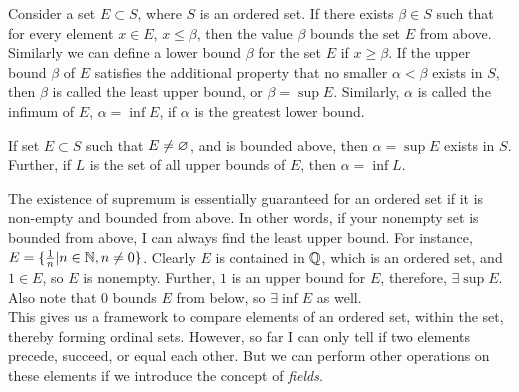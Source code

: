 Consider a set $E\subset S$, where $S$ is an ordered set. If there exists $\beta\in S$ such that for every element $x\in E$, $x\leq \beta$, then the value $\beta$ bounds the set $E$ from above. Similarly we can define a lower bound $\beta$ for the set $E$ if $x\geq \beta$.
If the upper bound $\beta$ of $E$ satisfies the additional property that no smaller $\alpha < \beta$ exists in $S$, then $\beta$ is called the least upper bound, or $\beta = \sup{E}$. Similarly, $\alpha$ is called the infimum of $E$, $\alpha=\inf{E}$, if $\alpha$ is the greatest lower bound.\\

\begin{theorem}
If set $E\subset S$ such that $E\neq \varnothing$, and is bounded above, then $\alpha=\sup{E}$ exists in $S$. Further, if $L$ is the set of all upper bounds of $E$, then $\alpha=\inf{L}$.
\end{theorem}
The existence of supremum is essentially guaranteed for an ordered set if it is non-empty and bounded from above. In other words, if your nonempty set is bounded from above, I can always find the least upper bound. For instance, $E=\{\frac{1}{n}|n\in \mathbb{N},n\neq0\}$. Clearly $E$ is contained in $\mathbb{Q}$, which is an ordered set, and $1\in E$, so $E$ is nonempty. Further, $1$ is an upper bound for $E$, therefore, $\exists \sup{E}$. Also note that $0$ bounds $E$ from below, so $\exists \inf{E}$ as well.\\

This gives us a framework to compare elements of an ordered set, within the set, thereby forming ordinal sets. However, so far I can only tell if two elements precede, succeed, or equal each other. But we can perform other operations on these elements if we introduce the concept of \textit{fields}.

